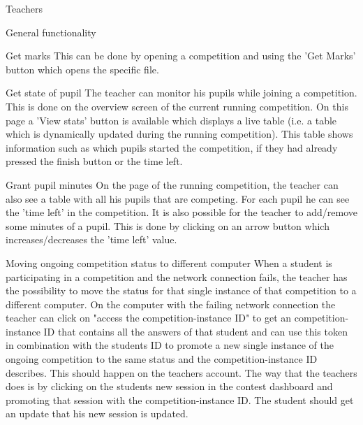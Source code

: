 \begin{section}{Teachers}
\begin{subsection}{General functionality}
\begin{subsubsection}{Get marks}
	This can be done by opening a competition and using the 'Get Marks' button which opens the specific file.
	\end{subsubsection}
	\begin{subsubsection}{Get state of pupil}
	The teacher can monitor his pupils while joining a competition. This is done on the overview screen of 		the current running competition. On this page a 'View stats' button is available which displays a live table 
	(i.e. a table which is dynamically updated during the running competition). This table shows information such as which pupils started the competition, if they had already pressed the finish button or the time left. 
	\end{subsubsection}
	\begin{subsubsection}{Grant pupil minutes}
	On the page of the running competition, the teacher can also see a table with all his pupils that are competing. For each pupil he can see the 'time left' in the competition. It is also 		possible for the teacher to add/remove some minutes of a pupil. This is done by clicking on an arrow button which increases/decreases the 'time left' value.
    \end{subsubsection}
    \begin{subsubsection}{Moving ongoing competition status to different computer}
    When a student is participating in a competition and the network connection fails, the teacher has the possibility to move the status for that single instance of that competition to a different computer. On the computer with the failing network connection the teacher can click on "access the competition-instance ID" to get an competition-instance ID that contains all the answers of that student and can use this token in combination with the students ID to promote a new single instance of the ongoing competition to the same status and the competition-instance ID describes. This should happen on the teachers account. The way that the teachers does is by clicking on the students new session in the contest dashboard and promoting that session with the competition-instance ID. The student should get an update that his new session is updated. 
    \end{subsubsection}
    \end{subsection}

\end{section}
